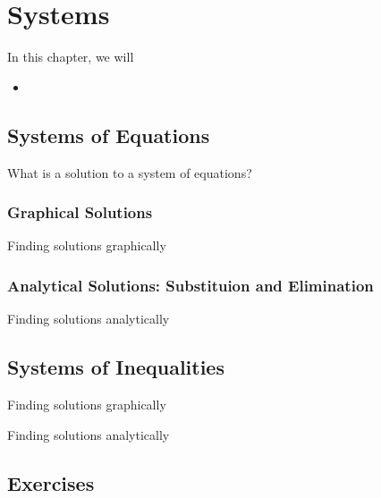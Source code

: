 
\chapter{Systems}

\begin{summary}
In this chapter, we will 
\begin{itemize}
    \item 
\end{itemize}
\end{summary}


\newpage 
\section{Systems of Equations}

What is a solution to a system of equations?

\subsection{Graphical Solutions}
Finding solutions graphically

\subsection{Analytical Solutions: Substituion and Elimination}
Finding solutions analytically 


\newpage 
\section{Systems of Inequalities}

Finding solutions graphically

Finding solutions analytically 



\newpage 
\section{Exercises} 